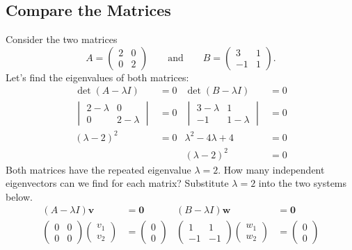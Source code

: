 \documentclass[11pt,letterpaper]{article}
\begin{document}
\subsection{Compare the Matrices}
Consider the two matrices
$$
A = \begin{pmatrix}
    2 & 0\\
    0 & 2
\end{pmatrix} \qquad\text{and}\qquad B = \begin{pmatrix}
    3 &1\\
    -1 & 1
\end{pmatrix}.
$$
Let's find the eigenvalues of both matrices:
\begin{align*}
    \det(A-\lambda I)&=0 & \det(B-\lambda I)&=0\\
    \begin{vmatrix}2-\lambda & 0\\ 0&2-\lambda \end{vmatrix} &=0 & \begin{vmatrix} 3-\lambda& 1\\ -1&1-\lambda\end{vmatrix}&=0\\
    (\lambda-2)^2&=0 & \lambda^2-4\lambda+4&=0\\
    & & (\lambda-2)^2&=0
\end{align*}
Both matrices have the repeated eigenvalue $\lambda=2$. How many independent eigenvectors can we find for each matrix? Substitute $\lambda=2$ into the two systems below.
\begin{align*}
    (A-\lambda I)\mathbf{v} &= \mathbf{0}   & (B-\lambda I)\mathbf{w} &= \mathbf{0} \\
    \begin{pmatrix}0 & 0\\ 0&0 \end{pmatrix}\begin{pmatrix}
        v_1\\v_2
    \end{pmatrix} &=\begin{pmatrix}
        0\\0
    \end{pmatrix} & \begin{pmatrix} 1& 1\\ -1&-1\end{pmatrix}\begin{pmatrix}
        w_1\\w_2
    \end{pmatrix}&=\begin{pmatrix}
        0\\0
    \end{pmatrix}
\end{align*}
\end{document}
